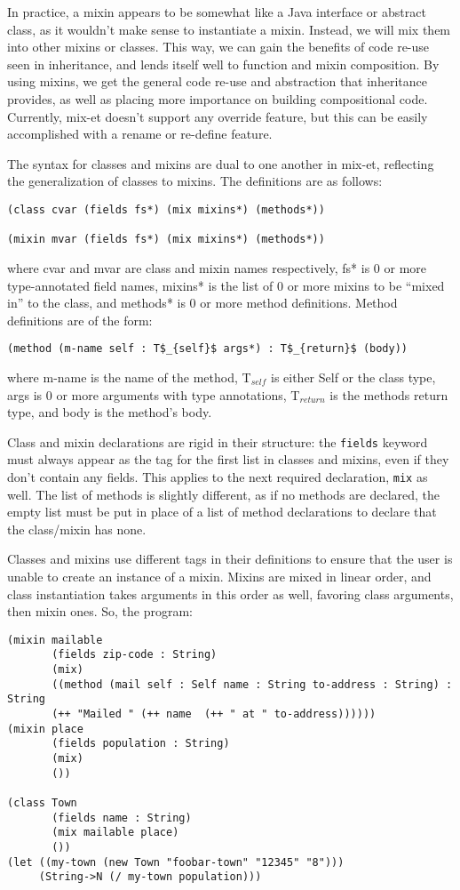 \documentclass{article}
\begin{document}
In practice, a mixin appears to be somewhat like a Java interface or abstract class, as it wouldn't make sense to instantiate a mixin. Instead, we will mix them into other mixins or classes. This way, we can gain the benefits of code re-use seen in inheritance, and lends itself well to function and mixin composition. By using mixins, we get the general code re-use and abstraction that inheritance provides, as well as placing more importance on building compositional code. Currently, mix-et doesn't support any override feature, but this can be easily accomplished with a rename or re-define feature\cite{bono1999}.


The syntax for classes and mixins are dual to one another in mix-et, reflecting the generalization of classes to mixins. The definitions are as follows:
\begin{verbatim}
(class cvar (fields fs*) (mix mixins*) (methods*))

(mixin mvar (fields fs*) (mix mixins*) (methods*))
\end{verbatim}
where cvar and mvar are class and mixin names respectively, fs* is 0 or more type-annotated field names, mixins* is the list of 0 or more mixins to be ``mixed in'' to the class, and methods* is 0 or more method definitions. Method definitions are of the form:
\begin{lstlisting}
(method (m-name self : T$_{self}$ args*) : T$_{return}$ (body))
\end{lstlisting}

where m-name is the name of the method, T$_{self}$ is either Self or the class type, args is 0 or more arguments with type annotations, T$_{return}$ is the methods return type, and body is the method's body.

Class and mixin declarations are rigid in their structure: the \verb|fields| keyword must always appear as the tag for the first list in classes and mixins, even if they don't contain any fields. This applies to the next required declaration, \verb|mix| as well. The list of methods is slightly different, as if no methods are declared, the empty list must be put in place of a list of method declarations to declare that the class/mixin has none.

Classes and mixins use different tags in their definitions to ensure that the user is unable to create an instance of a mixin. Mixins are mixed in linear order, and class instantiation takes arguments in this order as well, favoring class arguments, then mixin ones. So, the program:
\begin{verbatim}
(mixin mailable
       (fields zip-code : String)
       (mix)
       ((method (mail self : Self name : String to-address : String) : String
       (++ "Mailed " (++ name  (++ " at " to-address))))))
(mixin place
       (fields population : String)
       (mix)
       ())

(class Town
       (fields name : String)
       (mix mailable place)
       ())
(let ((my-town (new Town "foobar-town" "12345" "8")))
     (String->N (/ my-town population)))
\end{verbatim}
\end{document}
